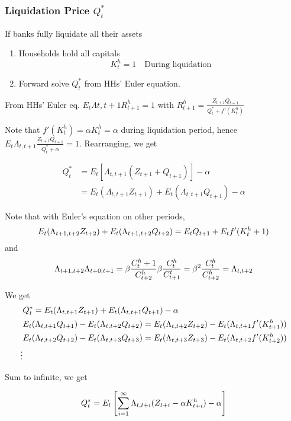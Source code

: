 \begin{frame}[allowframebreaks]
    \frametitle{Liquidation Price $Q^*_t$}

    If banks fully liquidate all their assets
    \begin{enumerate}
        \item Households hold all capitals
        \begin{equation}
            K^h_t = 1 \quad \text{During liquidation}
        \end{equation}
        \item Forward solve $Q^*_t$ from HHs' Euler equation.
    \end{enumerate}

    \framebreak 


    From HHs' Euler eq. $E_t \Lambda{t, t+1} R^h_{t+1} = 1$ with $R^h_{t+1} = \frac{Z_{t+1} Q_{t+1}}{Q^*_t + f'(K^h_t)}$

    Note that $f'(K^h_t) = \alpha K^h_t = \alpha$ during liquidation period, hence $E_t \Lambda_{t, t+1} \frac{Z_{t+1} Q_{t+1}}{Q^*_t + \alpha} = 1$. Rearranging, we get 

    \begin{align*}
        Q^*_t &= E_t[\Lambda_{t, t+1}(Z_{t+1} + Q_{t+1})] - \alpha \\
        & = E_t (\Lambda_{t, t+1}Z_{t+1}) + E_t(\Lambda_{t, t+1}Q_{t+1}) - \alpha
    \end{align*}


    Note that with Euler's equation on other periods, 
    \begin{equation*}
        E_t (\Lambda_{t+ 1, t+ 2} Z_{t+2}) + E_t (\Lambda_{t+ 1, t+ 2}Q_{t+2}) = E_t Q_{t+1}+ E_t f'(K^h_t+1)
    \end{equation*}
    and
    \begin{equation*}
        \Lambda_{t+ 1, t+ 2} \Lambda_{t+ 0, t+ 1} = \beta \frac{C^h_t+1}{C^h_{t+2}} \beta \frac{C^h_{t}}{C^t_{t+1}} = \beta^2\frac{C^h_t}{C^h_{t+2}} = \Lambda_{t, t+2}
    \end{equation*}
    
    We get
    \
    \begin{align*}
        &Q^*_t = E_t (\Lambda_{t, t+1}Z_{t+1}) + E_t(\Lambda_{t, t+1}Q_{t+1}) - \alpha \\
        &E_t(\Lambda_{t, t+1}Q_{t+1}) - E_t(\Lambda_{t, t+2}Q_{t+2}) = E_t(\Lambda_{t, t+2}Z_{t+2}) - E_t(\Lambda_{t, t+1}f'(K^h_{t+1}))\\
        &E_t(\Lambda_{t, t+2}Q_{t+2}) - E_t(\Lambda_{t, t+3}Q_{t+3}) = E_t(\Lambda_{t, t+3}Z_{t+3}) - E_t(\Lambda_{t, t+2}f'(K^h_{t+2}))\\
        \vdots \\
    \end{align*}

    Sum to infinite, we get 

    \begin{equation}
        Q^*_t = E_t \left[
            \sum_{i=1}^\infty \Lambda_{t, t+i}(Z_{t+i} - \alpha K^h_{t+i}) - \alpha
        \right]
    \end{equation}
\end{frame}


